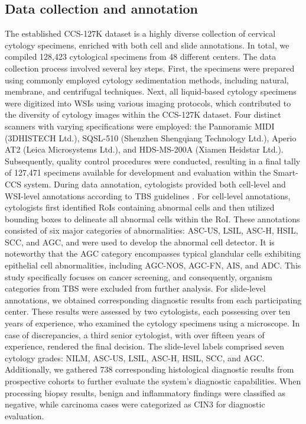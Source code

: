 \subsection*{Data collection and annotation}\label{subsec4-1}
The established CCS-127K dataset is a highly diverse collection of cervical cytology specimens, enriched with both cell and slide annotations. In total, we compiled 128,423 cytological specimens from 48 different centers. The data collection process involved several key steps. First, the specimens were prepared using commonly employed cytology sedimentation methods, including natural, membrane, and centrifugal techniques. Next, all liquid-based cytology specimens were digitized into WSIs using various imaging protocols, which contributed to the diversity of cytology images within the CCS-127K dataset. Four distinct scanners with varying specifications were employed: the Pannoramic MIDI (3DHISTECH Ltd.), SQSL-510 (Shenzhen Shengqiang Technology Ltd.), Aperio AT2 (Leica Microsystems Ltd.), and HDS-MS-200A (Xiamen Heidstar Ltd.). 
Subsequently, quality control procedures were conducted, resulting in a final tally of 127,471 specimens available for development and evaluation within the Smart-CCS system. During data annotation, cytologists provided both cell-level and WSI-level annotations according to TBS guidelines \cite{nayar2015bethesda}. For cell-level annotations, cytologists first identified RoIs containing abnormal cells and then utilized bounding boxes to delineate all abnormal cells within the RoI. These annotations consisted of six major categories of abnormalities: ASC-US, LSIL, ASC-H, HSIL, SCC, and AGC,  and were used to develop the abnormal cell detector. It is noteworthy that the AGC category encompasses typical glandular cells exhibiting epithelial cell abnormalities, including AGC-NOS, AGC-FN, AIS, and ADC. This study specifically focuses on cancer screening, and consequently, organism categories from TBS were excluded from further analysis. For slide-level annotations, we obtained corresponding diagnostic results from each participating center. These results were assessed by two cytologists, each possessing over ten years of experience, who examined the cytology specimens using a microscope. In case of discrepancies, a third senior cytologist, with over fifteen years of experience, rendered the final decision. The slide-level labels comprised seven cytology grades: NILM, ASC-US, LSIL, ASC-H, HSIL, SCC, and AGC. Additionally, we gathered 738 corresponding histological diagnostic results from prospective cohorts to further evaluate the system's diagnostic capabilities. When processing biopsy results, benign and inflammatory findings were classified as negative, while carcinoma cases were categorized as CIN3 for diagnostic evaluation.

